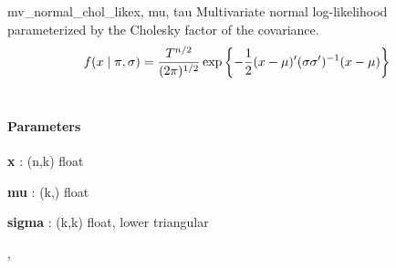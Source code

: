 \begin{funcdesc}{mv\_normal\_chol\_like}{x, mu, tau}
\hypertarget{pymc.distributions.mv_normal_chol_like}{}
Multivariate normal log-likelihood parameterized by the Cholesky factor of the covariance.
\begin{gather}
\begin{split}f(x \mid \pi, \sigma) = \frac{T^{n/2}}{(2\pi)^{1/2}} \exp\left\{ -\frac{1}{2} (x-\mu)^{\prime}(\sigma \sigma^{\prime})^{-1}(x-\mu) \right\}\end{split}\notag\\\begin{split}\end{split}\notag
\end{gather}\paragraph{Parameters}\begin{paramlist}

\item[] \textbf{x} : (n,k) float

\item[] \textbf{mu} : (k,) float

\item[] \textbf{sigma} : (k,k) float, lower triangular
\end{paramlist}



\hyperlink{pymc.distributions.mv_normal_like}{}, \hyperlink{pymc.distributions.mv_normal_cov_like}{}


\end{funcdesc}


